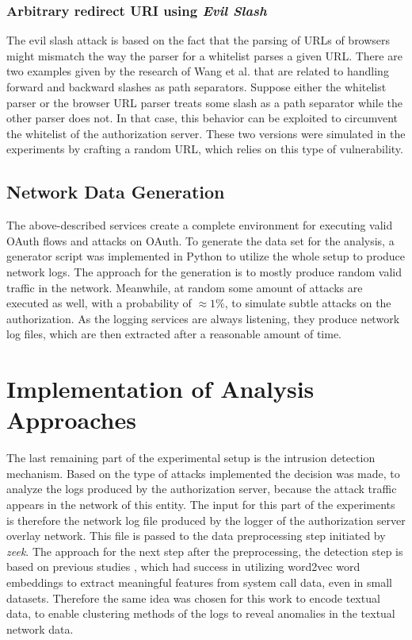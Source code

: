 \subsubsection{Arbitrary redirect URI using \emph{Evil Slash}}
The evil slash attack is based on the fact that the parsing of URLs of browsers might mismatch the way the parser for a whitelist parses a given URL. There are two examples given by the research of Wang et al. that are related to handling forward and backward slashes as path separators. Suppose either the whitelist parser or the browser URL parser treats some slash as a path separator while the other parser does not. In that case, this behavior can be exploited to circumvent the whitelist of the authorization server. These two versions were simulated in the experiments by crafting a random URL, which relies on this type of vulnerability.

\subsection{Network Data Generation}
The above-described services create a complete environment for executing valid OAuth flows and attacks on OAuth. To generate the data set for the analysis, a generator script was implemented in Python to utilize the whole setup to produce network logs. The approach for the generation is to mostly produce random valid traffic in the network. Meanwhile, at random some amount of attacks are executed as well, with a probability of $\approx 1\%$, to simulate subtle attacks on the authorization. As the logging services are always listening, they produce network log files, which are then extracted after a reasonable amount of time.

\section{Implementation of Analysis Approaches}
\label{sec:impl_analysis}
The last remaining part of the experimental setup is the intrusion detection mechanism. Based on the type of attacks implemented the decision was made, to analyze the logs produced by the authorization server, because the attack traffic appears in the network of this entity. The input for this part of the experiments is therefore the network log file produced by the logger of the authorization server overlay network. This file is passed to the data preprocessing step initiated by \emph{zeek}. The approach for the next step after the preprocessing, the detection step is based on previous studies \cite{corizzo2020feature}, which had success in utilizing word2vec word embeddings to extract meaningful features from system call data, even in small datasets. Therefore the same idea was chosen for this work to encode textual data, to enable clustering methods of the logs to reveal anomalies in the textual network data.

